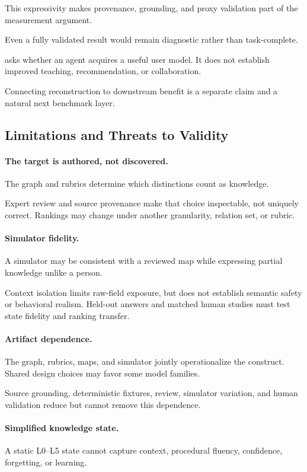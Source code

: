 This expressivity makes provenance, grounding, and proxy validation part of the measurement argument.

Even a fully validated result would remain diagnostic rather than task-complete.

\knowact asks whether an agent acquires a useful user model. It does not establish improved teaching,
recommendation, or collaboration.

Connecting reconstruction to downstream benefit is a separate claim and a natural next benchmark layer.

\subsection{Limitations and Threats to Validity}

\paragraph{The target is authored, not discovered.}
The graph and rubrics determine which distinctions count as knowledge.

Expert review and source provenance make that choice inspectable, not uniquely correct. Rankings may
change under another granularity, relation set, or rubric.

\paragraph{Simulator fidelity.}
A simulator may be consistent with a reviewed map while expressing partial knowledge unlike a person.

Context isolation limits raw-field exposure, but does not establish semantic safety or behavioral
realism. Held-out answers and matched human studies must test state fidelity and ranking transfer.

\paragraph{Artifact dependence.}
The graph, rubrics, maps, and simulator jointly operationalize the construct. Shared design choices may
favor some model families.

Source grounding, deterministic fixtures, review, simulator variation, and human validation reduce but
cannot remove this dependence.

\paragraph{Simplified knowledge state.}
A static L0--L5 state cannot capture context, procedural fluency, confidence, forgetting, or learning.

